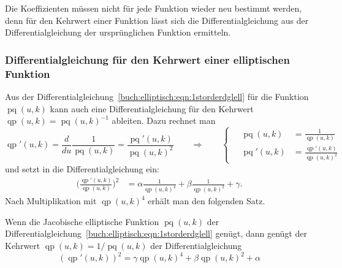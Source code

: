Die Koeffizienten müssen nicht für jede Funktion wieder neu bestimmt
werden, denn für den Kehrwert einer Funktion lässt sich die
Differentialgleichung aus der Differentialgleichung der ursprünglichen
Funktion ermitteln.

%
%
\subsubsection{Differentialgleichung für den Kehrwert einer elliptischen Funktion}
Aus der Differentialgleichung~\eqref{buch:elliptisch:eqn:1storderdglell}
für die Funktion $\operatorname{pq}(u,k)$ kann auch eine
Differentialgleichung für den Kehrwert
$\operatorname{qp}(u,k)=\operatorname{pq}(u,k)^{-1}$
ableiten.
Dazu rechnet man
\[
\operatorname{qp}'(u,k)
=
\frac{d}{du}\frac{1}{\operatorname{pq}(u,k)}
=
\frac{\operatorname{pq}'(u,k)}{\operatorname{pq}(u,k)^2}
\qquad\Rightarrow\qquad
\left\{
\quad
\begin{aligned}
\operatorname{pq}(u,k)
&=
\frac{1}{\operatorname{qp}(u,k)}
\\
\operatorname{pq}'(u,k)
&=
\frac{\operatorname{qp}'(u,k)}{\operatorname{qp}(u,k)^2}
\end{aligned}
\right.
\]
und setzt in die Differentialgleichung ein:
\begin{align*}
\biggl(
\frac{
\operatorname{qp}'(u,k)
}{
\operatorname{qp}(u,k)
}
\biggr)^2
&=
\alpha \frac{1}{\operatorname{qp}(u,k)^4}
+
\beta \frac{1}{\operatorname{qp}(u,k)^2}
+
\gamma.
\end{align*}
Nach Multiplikation mit $\operatorname{qp}(u,k)^4$ erhält man den
folgenden Satz.

\begin{satz}
%
Wenn die Jacobische elliptische Funktion $\operatorname{pq}(u,k)$
der Differentialgleichung~\eqref{buch:elliptisch:eqn:1storderdglell}
genügt, dann genügt der Kehrwert
$\operatorname{qp}(u,k) = 1/\operatorname{pq}(u,k)$ der Differentialgleichung
\begin{equation}
(\operatorname{qp}'(u,k))^2
= 
\gamma \operatorname{qp}(u,k)^4
+
\beta \operatorname{qp}(u,k)^2
+
\alpha
\label{buch:elliptisch:eqn:kehrwertdgl}
\end{equation}
\end{satz}

